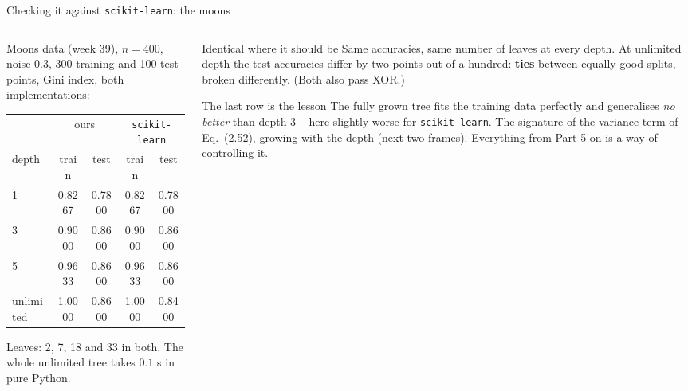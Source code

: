 \documentclass[10pt,aspectratio=169]{beamer}
\begin{document}
\begin{frame}{Checking it against \texttt{scikit-learn}: the moons}
\begin{columns}[T]
\begin{column}{0.52\textwidth}
\small
Moons data (week 39), $n=400$, noise $0.3$, 300 training and 100 test
points, Gini index, both implementations:
\begin{center}
\setlength{\tabcolsep}{4pt}
\begin{tabular}{lcccc}\toprule
 & \multicolumn{2}{c}{ours} & \multicolumn{2}{c}{\texttt{scikit-learn}}\\
depth & train & test & train & test\\\midrule
1 & 0.8267 & 0.7800 & 0.8267 & 0.7800\\
3 & 0.9000 & 0.8600 & 0.9000 & 0.8600\\
5 & 0.9633 & 0.8600 & 0.9633 & 0.8600\\
unlimited & 1.0000 & 0.8600 & 1.0000 & 0.8400\\\bottomrule
\end{tabular}
\end{center}
Leaves: 2, 7, 18 and 33 in both.  The whole unlimited tree takes $0.1$ s in
pure Python.
\end{column}
\begin{column}{0.46\textwidth}
\begin{block}{Identical where it should be}
Same accuracies, same number of leaves at every depth.  At unlimited depth
the test accuracies differ by two points out of a hundred: \textbf{ties}
between equally good splits, broken differently.  (Both also pass XOR.)
\end{block}
\begin{block}{The last row is the lesson}
The fully grown tree fits the training data perfectly and generalises
\emph{no better} than depth 3 -- here slightly worse for
\texttt{scikit-learn}.  The signature of the variance term of Eq.\ (2.52),
growing with the depth (next two frames).  Everything from Part 5 on is a
way of controlling it.
\end{block}
\end{column}
\end{columns}
\end{frame}
\end{document}
